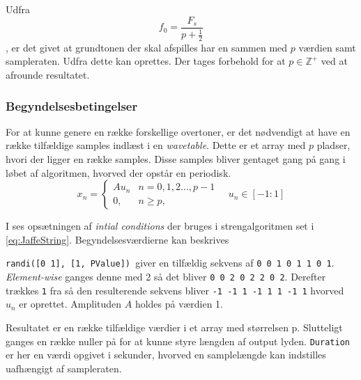 


Udfra 
\begin{equation}
f_0 = \frac{F_s}{p + \frac{1}{2}}     
\end{equation}, er det givet at grundtonen der skal afspilles har en sammen med $p$ værdien samt sampleraten. Udfra dette kan  oprettes. 
Der tages forbehold for at $p \in \mathbb{Z^+}$ ved at afrounde resultatet.  

\subsubsection{Begyndelsesbetingelser}
For at kunne genere en række forskellige overtoner, er det nødvendigt at have en række tilfældige samples indlæst i en \emph{wavetable}. Dette er et array med $p$ pladser, hvori der ligger en række samples. Disse samples bliver gentaget gang på gang i løbet af algoritmen, hvorved der opstår en periodisk.
\begin{equation}
    x_{n} = 
    \begin{cases} 
    A u_n & n = 0,1,2 \dots , p - 1\\
    0, & n \geq p,
\end{cases} 
\quad u_n \in [-1:1]  
\end{equation}


I  ses opsætningen af \emph{intial conditions} der bruges i strengalgoritmen set i \eqref{eq:JaffeString}. Begyndelsesværdierne kan beskrives \cite{Jaffe1983}


\texttt{randi([0 1], [1, PValue]) }giver en tilfældig sekvens af \texttt{0 0 1 0 1 1 0 1}. \emph{Element-wise} ganges denne med 2 så det bliver \texttt{0 0 2 0 2 2 0 2}. Derefter trækkes \texttt{1} fra så den resulterende sekvens bliver \texttt{-1 -1 1 -1 1 1 -1 1} hvorved $u_n$ er oprettet. Amplituden $A$ holdes på værdien 1.

Resultatet er en række tilfældige værdier i et array med størrelsen p. Slutteligt ganges en række nuller på for at kunne styre længden af output lyden. \texttt{Duration} er her en værdi opgivet i sekunder, hvorved en samplelængde kan indstilles uafhængigt af sampleraten.

